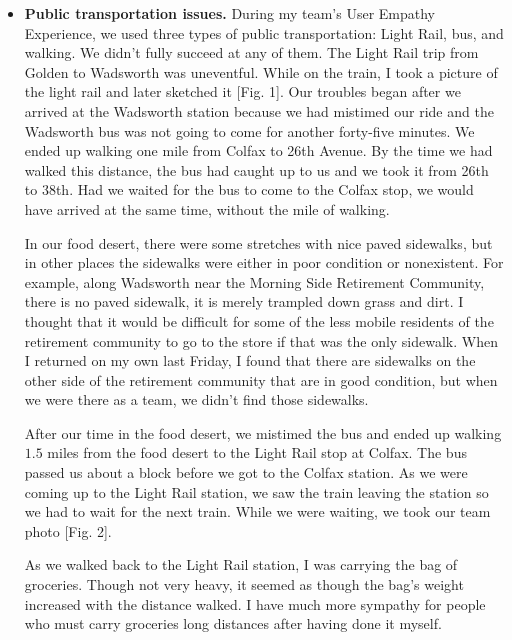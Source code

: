 \documentclass[11pt]{article}
\begin{document}
\begin{itemize}
    \item \textbf{Public transportation issues.} During my team's User Empathy Experience, we
        used three types of public transportation: Light Rail, bus, and walking. We didn't fully
        succeed at any of them. The Light Rail trip from Golden to Wadsworth was uneventful. While
        on the train, I took a picture of the light rail and later sketched it [Fig. 1]. Our
        troubles began after we arrived at the Wadsworth station because we had mistimed our ride
        and the Wadsworth bus was not going to come for another forty-five minutes. We ended up
        walking one mile from Colfax to 26th Avenue. By the time we had walked this distance, the
        bus had caught up to us and we took it from 26th to 38th. Had we waited for the bus to come
        to the Colfax stop, we would have arrived at the same time, without the mile of walking.

        In our food desert, there were some stretches with nice paved sidewalks, but in other
        places the sidewalks were either in poor condition or nonexistent. For example, along
        Wadsworth near the Morning Side Retirement Community, there is no paved sidewalk, it is
        merely trampled down grass and dirt. I thought that it would be difficult for some of the
        less mobile residents of the retirement community to go to the store if that was the only
        sidewalk. When I returned on my own last Friday, I found that there are sidewalks on the
        other side of the retirement community that are in good condition, but when we were there as
        a team, we didn't find those sidewalks.

        After our time in the food desert, we mistimed the bus and ended up walking $1.5$ miles from
        the food desert to the Light Rail stop at Colfax. The bus passed us about a block before we
        got to the Colfax station. As we were coming up to the Light Rail station, we saw the train
        leaving the station so we had to wait for the next train. While we were waiting, we took our
        team photo [Fig. 2].

        As we walked back to the Light Rail station, I was carrying the bag of groceries. Though not
        very heavy, it seemed as though the bag's weight increased with the distance walked. I have
        much more sympathy for people who must carry groceries long distances after having done it
        myself.


\end{itemize}
\end{document}
